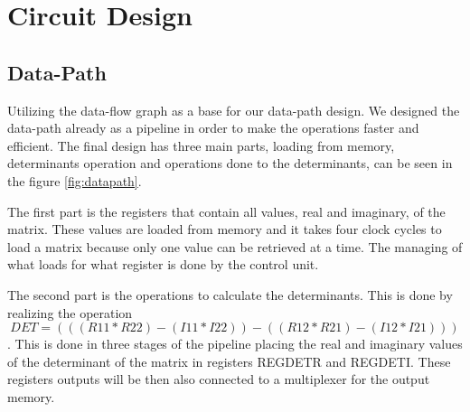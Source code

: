 \documentclass[12pt]{article}
\begin{document}
\section{Circuit Design}
\subsection{Data-Path}
Utilizing the data-flow graph as a base for our data-path design. We designed the data-path already as a pipeline in order to make the operations faster and efficient. The final design has three main parts, loading from memory, determinants operation and operations done to the determinants, can be seen in the figure \ref{fig:datapath}.

The first part is the registers that contain all values, real and imaginary, of the matrix. These values are loaded from memory and it takes four clock cycles to load a matrix because only one value can be retrieved at a time. The managing of what loads for what register is done by the control unit.

The second part is the operations to calculate the determinants. This is done by realizing the operation $$DET=(((R11*R22)-(I11*I22))-((R12*R21)-(I12*I21))) $$. This is done in three stages of the pipeline placing the real and imaginary values of the determinant of the matrix in registers REG\textunderscore DETR and REG\textunderscore DETI. These registers outputs will be then also connected to a multiplexer for the output memory.
\end{document}
